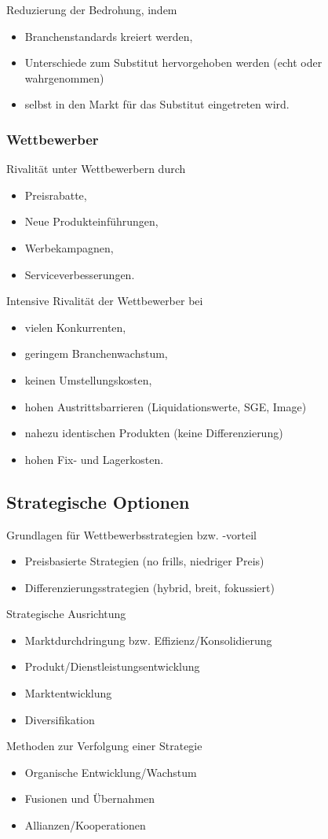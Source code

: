 Reduzierung der Bedrohung, indem
\begin{itemize}
	\item Branchenstandards kreiert werden,
	\item Unterschiede zum Substitut hervorgehoben werden (echt oder wahrgenommen)
	\item selbst in den Markt für das Substitut eingetreten wird.
\end{itemize}

\subsubsection{Wettbewerber}
Rivalität unter Wettbewerbern durch
\begin{itemize}
	\item Preisrabatte,
	\item Neue Produkteinführungen,
	\item Werbekampagnen,
	\item Serviceverbesserungen.
\end{itemize}

Intensive Rivalität der Wettbewerber bei
\begin{itemize}
	\item vielen Konkurrenten,
	\item geringem Branchenwachstum,
	\item keinen Umstellungskosten,
	\item hohen Austrittsbarrieren (Liquidationswerte, SGE, Image)
	\item nahezu identischen Produkten (keine Differenzierung)
	\item hohen Fix- und Lagerkosten.
\end{itemize}

\subsection{Strategische Optionen}
Grundlagen für Wettbewerbsstrategien bzw. -vorteil
\begin{itemize}
	\item Preisbasierte Strategien (no frills, niedriger Preis)
	\item Differenzierungsstrategien (hybrid, breit, fokussiert)
\end{itemize}
Strategische Ausrichtung
\begin{itemize}
	\item Marktdurchdringung bzw. Effizienz/Konsolidierung
	\item Produkt/Dienstleistungsentwicklung
	\item Marktentwicklung
	\item Diversifikation
\end{itemize}
Methoden zur Verfolgung einer Strategie
\begin{itemize}
	\item Organische Entwicklung/Wachstum
	\item Fusionen und Übernahmen
	\item Allianzen/Kooperationen
\end{itemize}

